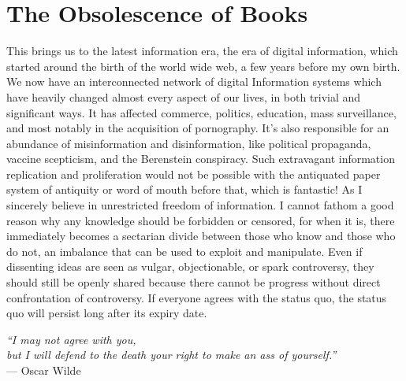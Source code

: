 

\section{The Obsolescence of Books}
This brings us to the latest information era, the era of digital information, which started around the birth of the world wide web, a few years before my own birth. We now have an interconnected network of digital Information systems which have heavily changed almost every aspect of our lives, in both trivial and significant ways. It has affected commerce, politics, education, mass surveillance, and most notably in the acquisition of pornography. It's also responsible for an abundance of misinformation and disinformation, like political propaganda, vaccine scepticism, and the Berenstein conspiracy. Such extravagant information replication and proliferation would not be possible with the antiquated paper system of antiquity or word of mouth before that, which is fantastic! As I sincerely believe in unrestricted freedom of information. I cannot fathom a good reason why any knowledge should be forbidden or censored, for when it is, there immediately becomes a sectarian divide between those who know and those who do not, an imbalance that can be used to exploit and manipulate. Even if dissenting ideas are seen as vulgar, objectionable, or spark controversy, they should still be openly shared because there cannot be progress without direct confrontation of controversy. If everyone agrees with the status quo, the status quo will persist long after its expiry date.

\begin{center}
\textit{``I may not agree with you, \\but I will defend to the death your right to make an ass of yourself.''} \\ --- Oscar Wilde
\end{center}

